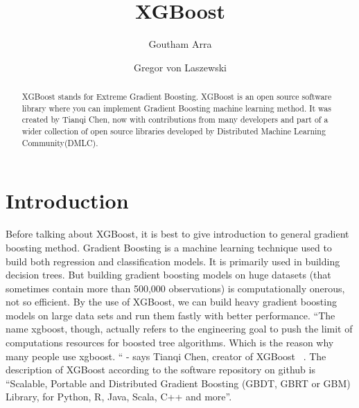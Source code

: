 
\title{XGBoost}


\author{Goutham Arra}

\author{Gregor von Laszewski}




\begin{abstract} 
XGBoost stands for Extreme Gradient Boosting. XGBoost is an
open source software library where you can  implement Gradient Boosting machine
learning method. It was created by Tianqi Chen, now with contributions from many
developers and part of a wider collection of open source libraries developed by
Distributed Machine Learning Community(DMLC).
\end{abstract}



\maketitle


\section{Introduction}  

Before talking about XGBoost, it is best to give introduction to general
gradient boosting method. Gradient Boosting is a machine learning technique used
to build both regression and classification models. It is primarily used in
building decision trees. But building gradient boosting models on huge datasets
(that sometimes contain more than 500,000 observations) is computationally
onerous, not so efficient. By the use of XGBoost, we can build  heavy gradient
boosting models on large data sets and run them fastly with better performance.
“The name xgboost, though, actually refers to the engineering goal to push the
limit of computations resources for boosted tree algorithms. Which is the reason
why many people use xgboost. “ - says Tianqi Chen, creator of XGBoost ~\cite
{hid-sp18-401-XGBoost-MLmastery}. The description of XGBoost according to the
software repository on github is “Scalable, Portable and Distributed Gradient
Boosting (GBDT, GBRT or GBM) Library, for Python, R, Java, Scala, C++ and more”.



